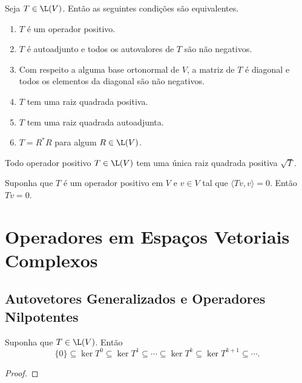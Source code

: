 \documentclass{article}
\begin{document}
\begin{prop} 
    Seja \(T \in \L(V)\). Então as seguintes condições são equivalentes.
    \begin{enumerate}
        \item [(a)] \(T\) é um operador positivo.
        \item [(b)] \(T\) é autoadjunto e todos os autovalores de \(T\) são não negativos.
        \item [(c)] Com respeito a alguma base ortonormal de \(V\), a matriz de \(T\) é diagonal e todos os elementos da diagonal são não negativos.
        \item [(d)] \(T\) tem uma raiz quadrada positiva.
        \item [(e)] \(T\) tem uma raiz quadrada autoadjunta.
        \item [(f)] \(T = R^* R\) para algum \(R \in \L(V)\).
    \end{enumerate}
\end{prop}

\begin{prop}
    Todo operador positivo \(T \in \L(V)\) tem uma única raiz quadrada positiva \(\sqrt{T}\).
\end{prop}

\begin{prop}
    Suponha que \(T\) é um operador positivo em \(V\) e \(v \in V\) tal que \(\langle Tv, v \rangle = 0\). Então \(Tv = 0\).
\end{prop}

\section{Operadores em Espaços Vetoriais Complexos}

\subsection{Autovetores Generalizados e Operadores Nilpotentes}

\begin{prop}
    Suponha que \(T \in \L(V)\). Então 
    \begin{equation}
        \{0\} \subseteq \ker T^{0} \subseteq \ker T^1 \subseteq \cdots \subseteq \ker T^k \subseteq \ker T^{k+1} \subseteq \cdots .
    \end{equation}
\end{prop}

\begin{proof}
    
\end{proof}
\end{document}
